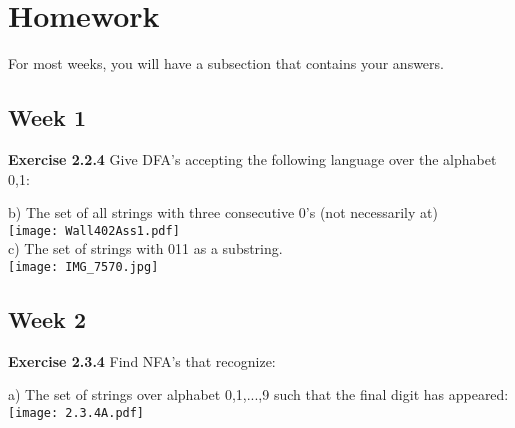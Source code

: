 \documentclass{article}
\theoremstyle{theorem}
\newtheorem{theorem}{Theorem}[section]
\newtheorem{proposition}[theorem]{Proposition}
\theoremstyle{definition}
\theoremstyle{remark}
\begin{document}





\section{Homework}\label{homework}



For most weeks, you will have a subsection that contains your answers.

\subsection{Week 1}
\textbf{Exercise 2.2.4} Give DFA's accepting the following language over the alphabet 0,1:

b) The set of all strings with three consecutive 0's (not necessarily at)
\\
\texttt{[image: Wall402Ass1.pdf]}
\\
c) The set of strings with 011 as a substring.
\\
\texttt{[image: IMG\_7570.jpg]}
%
\subsection{Week 2}
\textbf{Exercise 2.3.4} Find NFA's that recognize:

a) The set of strings over alphabet {0,1,...,9} such that the final digit has appeared:
\\
\texttt{[image: 2.3.4A.pdf]}
\end{document}
